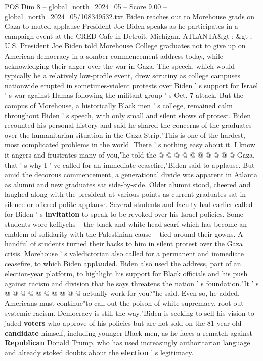 \begin{textsample}{POS Dim 8 – global\_north\_2024\_05 – Score 9.00 – global\_north\_2024\_05/108349532.txt}  \label{ex:f8_pos_080}
Biden reaches out to Morehouse grads on Gaza to muted applause President Joe Biden speaks as he participates in a campaign event at the CRED Cafe in Detroit, Michigan.
ATLANTA\&gt ; \&gt ; U.S.
President Joe Biden told Morehouse College graduates not to give up on American democracy in a somber commencement address today, while acknowledging their anger over the war in Gaza.
The speech, which would typically be a relatively low-profile event, drew scrutiny as college campuses nationwide erupted in sometimes-violent protests over Biden ' s support for Israel ' s war against Hamas following the militant group ' s Oct. 7 attack.
But the campus of Morehouse, a historically Black men ' s college, remained calm throughout Biden ' s speech, with only small and silent shows of protest.
Biden recounted his personal history and said he shared the concerns of the graduates over the humanitarian situation in the Gaza Strip."This is one of the hardest, most complicated problems in the world.
There ' s nothing easy about it.
I know it angers and frustrates many of you,"he told the @ @ @ @ @ @ @ @ @ @ Gaza, that ' s why I ' ve called for an immediate ceasefire,"Biden said to applause.
But amid the decorous commencement, a generational divide was apparent in Atlanta as alumni and new graduates sat side-by-side.
Older alumni stood, cheered and laughed along with the president at various points as current graduates sat in silence or offered polite applause.
Several students and faculty had earlier called for Biden ' s \textbf{invitation} to speak to be revoked over his Israel policies.
Some students wore keffiyehs -- the black-and-white head scarf which has become an emblem of solidarity with the Palestinian cause -- tied around their gowns.
A handful of students turned their backs to him in silent protest over the Gaza crisis.
Morehouse ' s valedictorian also called for a permanent and immediate ceasefire, to which Biden applauded.
Biden also used the address, part of an election-year platform, to highlight his support for Black officials and his push against racism and division that he says threatens the nation ' s foundation."It ' s @ @ @ @ @ @ @ @ @ @ actually work for you?"he said.
Even so, he added, Americans must continue"to call out the poison of white supremacy, root out systemic racism.
Democracy is still the way."Biden is seeking to sell his vision to jaded \textbf{voters} who approve of his policies but are not sold on the 81-year-old \textbf{candidate} himself, including younger Black men, as he faces a rematch against \textbf{Republican} Donald Trump, who has used increasingly authoritarian language and already stoked doubts about the \textbf{election} ' s legitimacy.

\end{textsample}
